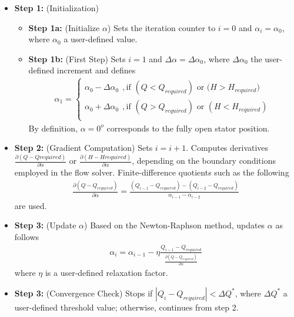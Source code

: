\begin{itemize}
\item[]{\bf Step 1:}  (Initialization) 
\begin{itemize}
	\item[]{\bf Step 1a:} (Initialize $\alpha$) Sets the iteration counter to $i=0$ and $\alpha_i=\alpha _0$, where $\alpha _0$ a user-defined value.
	\item[]{\bf Step 1b:} (First Step) Sets $i \! = \! 1$ and $\Delta \alpha \! = \! \Delta \alpha_0$, where $\Delta \alpha_0$ the user-defined increment and defines 
\begin{eqnarray}
	\alpha_1={\left\{ 
	\begin{array}{ll}
    \alpha_0 - \Delta \alpha_0 ~~,\mbox{if $(Q < Q_{required})$ or ($H > H_{required})$}\\
	\alpha_0 + \Delta \alpha_0 ~~,\mbox{if $(Q > Q_{required})$ or $(H < H_{required})$}\\
    \end{array} \right. }
    \label{step0}
\end{eqnarray}  
By definition, $\alpha=0^o$ corresponds to the fully open stator position.
\end{itemize}

\item[]{\bf Step 2:}  (Gradient Computation) Sets $i=i+1$. Computes derivatives $\frac{\partial(Q-Q{required})}{\partial \alpha}$ or $\frac{\partial(H-H{required})}{\partial \alpha}$, depending on the boundary conditions employed  in the flow solver. Finite-difference quotients such as the following  
\begin{eqnarray}
	\frac{\partial(Q-Q_{required})}{\partial \alpha}=\frac{(Q_{i-1}-Q_{required})-(Q_{i-2}-Q_{required})}{\alpha_{i-1}- \alpha_{i-2}}
\end{eqnarray}  
are used. 

\item[]{\bf Step 3:}  (Update $\alpha$) Based on the Newton-Raphson method, updates $\alpha$ as follows
\begin{eqnarray}
	\alpha_{i}=\alpha_{i-1} - \eta \frac{Q_{i-1}-Q_{required}} {\frac{\partial(Q-Q_{required})}{\partial \alpha}}  
\end{eqnarray}  
where $\eta$ is a user-defined relaxation factor. 

\item[]{\bf Step 3:} (Convergence Check) Stops if $|Q_{i}-Q_{required}|<\Delta Q^*$, where $\Delta Q^*$ a user-defined threshold value; otherwise, continues from step 2. 
\end{itemize}  

